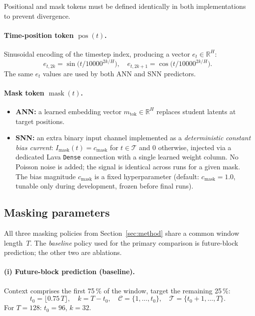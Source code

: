 \documentclass[11pt,a4paper]{article}
\newcommand{\pos}{\operatorname{pos}}      %
\newcommand{\mask}{\operatorname{mask}}    %
\begin{document}
Positional and mask tokens must be defined identically in both
implementations to prevent divergence.

\paragraph{Time-position token $\pos(t)$.}
Sinusoidal encoding of the timestep index, producing a vector
$e_t\in\mathbb{R}^H$:
\begin{equation}\label{eq:pos-enc}
e_{t,2k}   = \sin\!\bigl(t / 10000^{2k/H}\bigr), \quad
e_{t,2k+1} = \cos\!\bigl(t / 10000^{2k/H}\bigr).
\end{equation}
The same $e_t$ values are used by both ANN and SNN predictors.

\paragraph{Mask token $\mask(t)$.}
\begin{itemize}[nosep]
\item \textbf{ANN:} a learned embedding vector $m_{\text{tok}} \in
  \mathbb{R}^H$ replaces student latents at target positions.
\item \textbf{SNN:} an extra binary input channel implemented as a
  \emph{deterministic constant bias current}: $I_{\text{mask}}(t) =
  c_{\text{mask}}$ for $t\in\mathcal{T}$ and $0$ otherwise, injected
  via a dedicated Lava \texttt{Dense} connection with a single learned
  weight column.  No Poisson noise is added; the signal is identical
  across runs for a given mask.  The bias magnitude $c_{\text{mask}}$
  is a fixed hyperparameter (default: $c_{\text{mask}} = 1.0$,
  tunable only during development, frozen before final runs).
\end{itemize}

\subsection{Masking parameters}\label{sec:mask-params}

All three masking policies from Section~\ref{sec:method} share a common
window length~$T$.  The \emph{baseline} policy used for the primary
comparison is future-block prediction; the other two are ablations.

\paragraph{(i) Future-block prediction (baseline).}
Context comprises the first 75\,\% of the window, target the remaining
25\,\%:
\[
  t_0 = \lfloor 0.75\,T \rfloor, \quad
  k   = T - t_0, \quad
  \mathcal{C}=\{1,\dots,t_0\}, \quad
  \mathcal{T}=\{t_0{+}1,\dots,T\}.
\]
For $T=128$: $t_0=96$, $k=32$.
\end{document}
